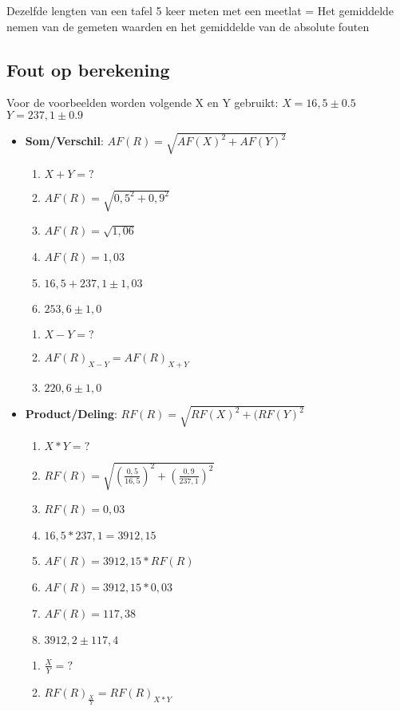 \documentclass[12pt]{report}
\newcommand{\important}[1] {\textbf{\color{orange}#1}}
\begin{document}
Dezelfde lengten van een tafel 5 keer meten met een meetlat = 
Het gemiddelde nemen van de gemeten waarden en het gemiddelde van de absolute
fouten


\subsection{Fout op berekening}
Voor de voorbeelden worden volgende X en Y gebruikt: \newline
$X = 16,5 \pm 0.5 $
\newline
$Y = 237,1 \pm 0.9 $
\begin{itemize}
 \item \important{Som/Verschil}: $AF(R) = \sqrt{AF(X)^2 + AF(Y)^2}$
 \begin{enumerate}
  \item $X + Y = ?$
  \item $AF(R) = \sqrt{0,5^2 + 0,9^2}$
  \item $AF(R) = \sqrt{1,06}$
  \item $AF(R) = 1,03$
  \item $16,5 + 237,1 \pm 1,03$
  \item \important{$253,6 \pm 1,0$}
 \end{enumerate}
 \begin{enumerate}
  \item $X - Y = ?$
  \item $AF(R)_{X-Y} = AF(R)_{X+Y}$ 
  \item \important{$220,6 \pm 1,0$}
 \end{enumerate}
 \item \important{Product/Deling}: $RF(R) = \sqrt{RF(X)^2 + (RF(Y)^2}$
  \begin{enumerate}
   \item $X * Y = ?$
   \item $RF(R) = \sqrt{(\frac{0,5}{16,5})^2 + (\frac{0,9}{237,1})^2}$
   \item $RF(R) = 0,03$
   \item $16,5 * 237,1 = 3912,15$
   \item $AF(R) = 3912,15 * RF(R)$
   \item $AF(R) = 3912,15 * 0,03$
   \item $AF(R) = 117,38$
   \item \important{$3912,2 \pm 117,4$}
  \end{enumerate}
  \begin{enumerate}
   \item $\frac{X}{Y} = ?$
   \item $RF(R)_{\frac{X}{Y}} = RF(R)_{X * Y}$

\end{enumerate}
\end{itemize}
\end{document}
